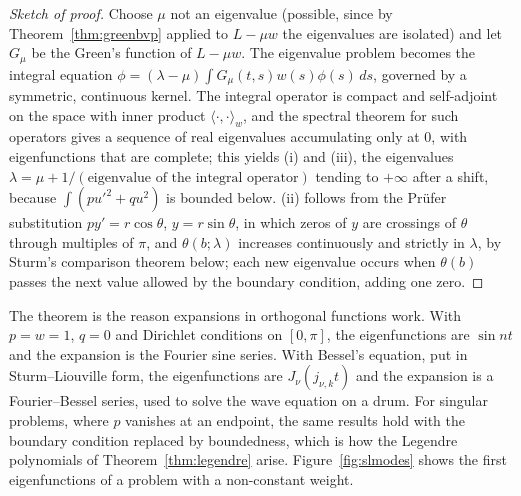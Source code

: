 \documentclass[11pt,a4paper]{article}
\numberwithin{equation}{section}
\theoremstyle{definition}
\begin{document}
\begin{proof}[Sketch of proof]
Choose $\mu$ not an eigenvalue (possible, since by Theorem~\ref{thm:greenbvp} applied to $L - \mu w$ the eigenvalues are isolated) and let $G_\mu$ be the Green's function of $L - \mu w$. The eigenvalue problem becomes the
integral equation $\phi = (\lambda - \mu)\int G_\mu(t, s)w(s)\phi(s)\,ds$, governed by a symmetric, continuous kernel. The integral operator is compact and self-adjoint on the space with inner product $\langle\cdot,\cdot\rangle_w$,
and the spectral theorem for such operators gives a sequence of real eigenvalues accumulating only at $0$, with eigenfunctions that are complete; this yields (i) and (iii), the eigenvalues
$\lambda = \mu + 1/(\text{eigenvalue of the integral operator})$ tending to $+\infty$ after a shift, because $\int(pu'^2 + qu^2)$ is bounded below. (ii) follows from the Pr\"ufer substitution
$py' = r\cos\theta$, $y = r\sin\theta$, in which zeros of $y$ are crossings of $\theta$ through multiples of $\pi$, and $\theta(b; \lambda)$ increases continuously and strictly in $\lambda$, by Sturm's comparison theorem
below; each new eigenvalue occurs when $\theta(b)$ passes the next value allowed by the boundary condition, adding one zero.
\end{proof}

The theorem is the reason expansions in orthogonal functions work. With $p = w = 1$, $q = 0$ and Dirichlet conditions on $[0, \pi]$, the eigenfunctions are $\sin nt$ and the expansion is the Fourier
sine series. With Bessel's equation, put in Sturm--Liouville form, the eigenfunctions are $J_\nu(j_{\nu,k}t)$ and the expansion is a Fourier--Bessel series, used to solve the wave equation on a drum. For
singular problems, where $p$ vanishes at an endpoint, the same results hold with the boundary condition replaced by boundedness, which is how the Legendre polynomials of
Theorem~\ref{thm:legendre} arise. Figure~\ref{fig:slmodes} shows the first eigenfunctions of a problem with a non-constant weight.
\end{document}
